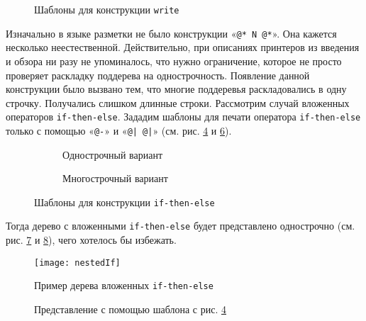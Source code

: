 \begin{figure}[h!]
	\begin{subfigure}[h]{0.45\textwidth}
		
		\caption{}
		\label{fig:writeTmplt1}
	\end{subfigure}
	\begin{subfigure}[h]{0.45\textwidth}
		
		\caption{}
		\label{fig:writeTmplt2}
	\end{subfigure}
	\caption{Шаблоны для конструкции \lstinline{write}}
\end{figure}

Изначально в языке разметки не было конструкции «\lstinline{@* N @*}». Она кажется несколько неестественной. Действительно, при описаниях принтеров из введения и обзора ни разу не упоминалось, что нужно ограничение, которое не просто проверяет раскладку поддерева на однострочность.
Появление данной конструкции было вызвано тем, что многие поддеревья раскладовались в одну строчку. Получались слишком длинные строки. Рассмотрим случай вложенных операторов \lstinline{if-then-else}. Зададим шаблоны для печати оператора \lstinline{if-then-else} только с помощью «\lstinline{@-}» и «\lstinline{@| @|}» (см. рис. \ref{fig:flatBadIfTmplt} и \ref{fig:multBadIfTmplt}).

\begin{figure}[h!]
	\begin{subfigure}[h]{0.45\textwidth}
		
		\caption{Однострочный вариант}
		\label{fig:flatBadIfTmplt}
	\end{subfigure}
	\begin{subfigure}[h]{0.45\textwidth}
		
		\caption{Многострочный вариант}
		\label{fig:multBadIfTmplt}
	\end{subfigure}
	\caption{Шаблоны для конструкции \lstinline{if-then-else}}
\end{figure}

Тогда дерево с вложенными \lstinline{if-then-else} будет представлено однострочно (см. рис. \ref{fig:nestedIf} и \ref{fig:nestedIfFlatCode}), чего хотелось бы избежать.

\begin{figure}[h!]
	\centering
	\texttt{[image: nestedIf]}
	\caption{Пример дерева вложенных \lstinline{if-then-else}}
	\label{fig:nestedIf}
\end{figure}

\begin{figure}[h!]
	\centering
	
	\caption{Представление с помощью шаблона с рис. \ref{fig:flatBadIfTmplt}}
	\label{fig:nestedIfFlatCode}
\end{figure}

